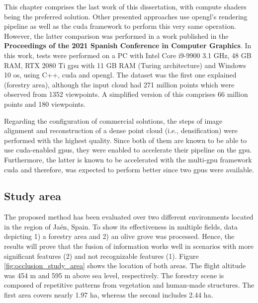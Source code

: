 \begin{kaobox}[frametitle=\acrshort{opengl} and \acrshort{cuda} comparison]
This chapter comprises the last work of this dissertation, with compute shaders being the preferred solution. Other presented approaches use \acrshort{opengl}'s rendering pipeline as well as the \acrshort{cuda} framework to perform this very same operation. However, the latter comparison was performed in a work published in the \textbf{Proceedings of the 2021 Spanish Conference in Computer Graphics}. In this work, tests were performed on a PC with Intel Core i9-9900 3.1 GHz, 48 GB RAM, RTX 2080 Ti \acrshort{gpu} with 11 GB RAM (Turing architecture) and Windows 10 \acrshort{os}, using C++, \acrshort{cuda} and \acrshort{opengl}. The dataset was the first one explained (forestry area), although the input cloud had 271 million points which were observed from 1352 viewpoints. A simplified version of this comprises 66 million points and 180 viewpoints. 
\end{kaobox}

Regarding the configuration of commercial solutions, the steps of image alignment and reconstruction of a dense point cloud (i.e., densification) were performed with the highest quality. Since both of them are known to be able to use \acrshort{cuda}-enabled \acrshort{gpu}s, they were enabled to accelerate their pipeline on the \acrshort{gpu}. Furthermore, the latter is known to be accelerated with the multi-\acrshort{gpu} framework \acrshort{cuda} and therefore, was expected to perform better since two \acrshort{gpu}s were available.  

\subsection{Study area}

The proposed method has been evaluated over two different environments located in the region of Jaén, Spain. To show its effectiveness in multiple fields, data depicting 1) a forestry area and 2) an olive grove was processed. Hence, the results will prove that the fusion of information works well in scenarios with more significant features (2) and not recognizable features (1). Figure \ref{fig:occlusion_study_area} shows the location of both areas. The flight altitude was 454 \si{\meter} and 595 \si{\meter} above sea level, respectively. The forestry scene is composed of repetitive patterns from vegetation and human-made structures. The first area covers nearly 1.97 \si{\hectare}, whereas the second includes 2.44 \si{\hectare}.

